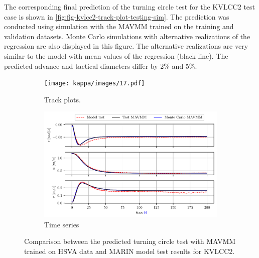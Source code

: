 The corresponding final prediction of the turning circle test for the KVLCC2 test case is shown in \autoref{fig:fig-kvlcc2-track-plot-testing-sim}. The prediction was conducted using simulation with the MAVMM trained on the training and validation datasets. Monte Carlo simulations with alternative realizations of the regression are also displayed in this figure. The alternative realizations are very similar to the model with mean values of the regression (black line).
The predicted advance and tactical diameters differ by 2\% and 5\%.
\begin{figure}[h]
    \centering

    \begin{subfigure}[b]{0.80\textwidth}
        \texttt{[image: kappa/images/17.pdf]}
        \caption{Track plots.}
    \end{subfigure}
    \vfill
    \begin{subfigure}[b]{0.80\textwidth}
        \includegraphics[width=\textwidth]{kappa/images/18.pdf}
        \caption{Time series}
    \end{subfigure}
        
    \caption{Comparison between the predicted turning circle test with MAVMM trained on HSVA data and MARIN model test results for KVLCC2.}
    \label{fig:fig-kvlcc2-track-plot-testing-sim}
\end{figure}